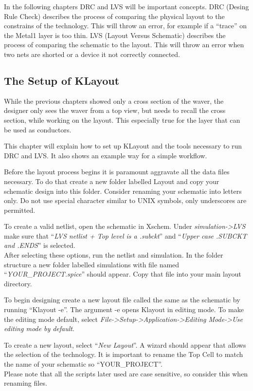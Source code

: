 \documentclass[
  letterpaper,
]{scrbook}
\begin{document}
In the following chapters DRC and LVS will be important concepts. DRC
(Desing Rule Check) describes the process of comparing the physical
layout to the constrains of the technology. This will throw an error,
for example if a ``trace'' on the Metal1 layer is too thin. LVS (Layout
Versus Schematic) describes the process of comparing the schematic to
the layout. This will throw an error when two nets are shorted or a
device it not correctly connected.

\subsection{The Setup of KLayout}\label{the-setup-of-klayout}

While the previous chapters showed only a cross section of the waver,
the designer only sees the waver from a top view, but needs to recall
the cross section, while working on the layout. This especially true for
the layer that can be used as conductors.

This chapter will explain how to set up KLayout and the tools necessary
to run DRC and LVS. It also shows an example way for a simple workflow.

Before the layout process begins it is paramount aggravate all the data
files necessary. To do that create a new folder labelled Layout and copy
your schematic design into this folder. Consider renaming your schematic
into letters only. Do not use special character similar to UNIX symbols,
only underscores are permitted.

To create a valid netlist, open the schematic in Xschem. Under
\emph{simulation-\textgreater LVS} make sure that ``\emph{LVS netlist +
Top level is a .subckt}'' and ``\emph{Upper case .SUBCKT and .ENDS}'' is
selected.\\
After selecting these options, run the netlist and simulation. In the
folder structure a new folder labelled simulations with file named
``\emph{YOUR\_PROJECT.spice}'' should appear. Copy that file into your
main layout directory.

To begin designing create a new layout file called the same as the
schematic by running ``Klayout -e''. The argument -e opens Klayout in
editing mode. To make the editing mode default, select
\emph{File-\textgreater Setup-\textgreater Application-\textgreater Editing
Mode-\textgreater Use} \emph{editing mode by default}.

To create a new layout, select ``\emph{New Layout}''. A wizard should
appear that allows the selection of the technology. It is important to
rename the Top Cell to match the name of your schematic so
``YOUR\_PROJECT''.\\
Please note that all the scripts later used are case sensitive, so
consider this when renaming files.
\end{document}
